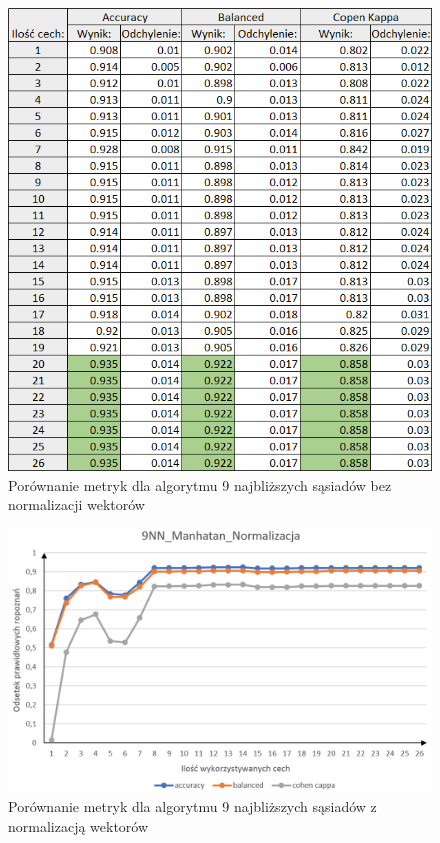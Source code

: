 \documentclass[12pt]{article}
\begin{document}
\begin{figure}[H]
	\centering
		\includegraphics[scale=0.9]{images/metrics/9nn_manhatan_beznorm_tab.png}
	\caption{Porównanie metryk dla algorytmu 9 najbliższych sąsiadów bez normalizacji wektorów}
\end{figure}
\begin{figure}[H]
	\centering
		\includegraphics[scale=0.66]{images/metrics/9nn_manhatan_norm.png}
	\caption{Porównanie metryk dla algorytmu 9 najbliższych sąsiadów z normalizacją wektorów}
\end{figure}
\end{document}
